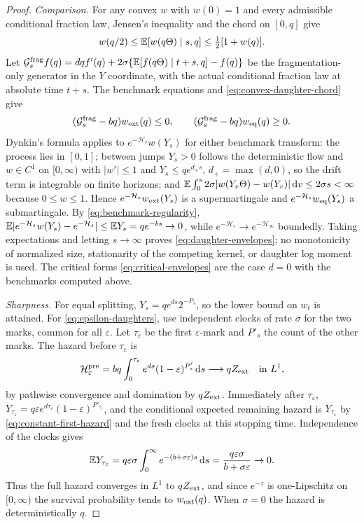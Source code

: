 \begin{proof}
\emph{Comparison.} For any convex $w$ with $w(0)=1$ and every
admissible conditional fraction law, Jensen's inequality and the
chord on $[0,q]$ give
\begin{equation}
 w(q/2)\leq\mathbb E[w(q\Theta)\mid s,q]
               \leq\tfrac12[1+w(q)].
 \label{eq:convex-daughter-chord}
\end{equation}
Let $\mathcal G^{\rm frag}_sf(q)=dqf'(q)
+2\sigma\{\mathbb E[f(q\Theta)\mid t+s,q]-f(q)\}$ be the fragmentation-only
generator in the $Y$ coordinate, with the actual conditional fraction
law at absolute time $t+s$. The benchmark equations and
\eqref{eq:convex-daughter-chord} give
\[
 (\mathcal G^{\rm frag}_s-bq)w_{\rm ext}(q)\leq0,\qquad
 (\mathcal G^{\rm frag}_s-bq)w_{\rm eq}(q)\geq0.
\]
Dynkin's formula applies to $e^{-\mathcal H_s}w(Y_s)$ for either
benchmark transform: the process lies in $[0,1]$; between jumps
$Y_s>0$ follows the deterministic flow and $w\in C^1$ on $[0,\infty)$
with $|w'|\leq1$ and $Y_s\leq qe^{d_+s}$, $d_+=\max(d,0)$, so the
drift term is integrable on finite horizons; and
$\mathbb E\int_0^s2\sigma|w(Y_v\Theta)-w(Y_v)|\,\mathrm d v\leq2\sigma s<\infty$
because $0\leq w\leq1$. Hence $e^{-\mathcal H_s}w_{\rm ext}(Y_s)$ is a
supermartingale and $e^{-\mathcal H_s}w_{\rm eq}(Y_s)$ a submartingale.
By \eqref{eq:benchmark-regularity},
$\mathbb E|e^{-\mathcal H_s}w(Y_s)-e^{-\mathcal H_s}|\leq\mathbb E Y_s=qe^{-bs}\to0$,
while $e^{-\mathcal H_s}\to e^{-\mathcal H_\infty}$ boundedly. Taking
expectations and letting $s\to\infty$ proves
\eqref{eq:daughter-envelopes}; no monotonicity of normalized size,
stationarity of the competing kernel, or daughter log moment is used.
The critical forms \eqref{eq:critical-envelopes} are the case $d=0$
with the benchmarks computed above.

\emph{Sharpness.} For equal splitting, $Y_s=qe^{ds}2^{-P_s}$, so the
lower bound on $w_t$ is attained. For \eqref{eq:epsilon-daughters},
use independent clocks of rate $\sigma$ for the two marks, common for
all $\varepsilon$. Let $\tau_\varepsilon$ be the first
$\varepsilon$-mark and $P'_s$ the count of the other marks. The hazard
before $\tau_\varepsilon$ is
\[
 \mathcal H^{\rm pre}_\varepsilon
 =bq\int_0^{\tau_\varepsilon}e^{ds}(1-\varepsilon)^{P'_s}\,\mathrm d s
       \longrightarrow qZ_{\rm ext}\quad\hbox{in }L^1,
\]
by pathwise convergence and domination by $qZ_{\rm ext}$. Immediately
after $\tau_\varepsilon$,
$Y_{\tau_\varepsilon}=q\varepsilon e^{d\tau_\varepsilon}
(1-\varepsilon)^{P'_{\tau_\varepsilon}}$, and the conditional expected
remaining hazard is $Y_{\tau_\varepsilon}$ by
\eqref{eq:constant-first-hazard} and the fresh clocks at this stopping
time. Independence of the clocks gives
\begin{equation}
 \mathbb E Y_{\tau_\varepsilon}=q\varepsilon\sigma\int_0^\infty
                   e^{-(b+\sigma\varepsilon)s}\,\mathrm d s
          =\frac{q\varepsilon\sigma}{b+\sigma\varepsilon}\to0.
 \label{eq:epsilon-residual}
\end{equation}
Thus the full hazard converges in $L^1$ to $qZ_{\rm ext}$, and since
$e^{-z}$ is one-Lipschitz on $[0,\infty)$ the survival probability
tends to $w_{\rm ext}(q)$. When $\sigma=0$ the hazard is
deterministically $q$.
\end{proof}

